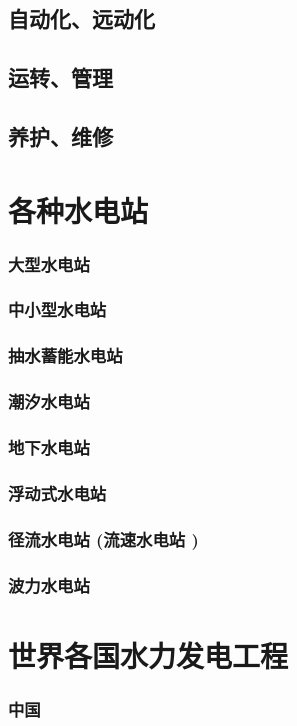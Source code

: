 \documentclass[UTF8]{../../ApplicationUniverse}
\begin{document}
    \subsection{自动化、远动化}
    \subsection{运转、管理}
    \subsection{养护、维修}
\section{各种水电站}
    \subsubsection{大型水电站}
    \subsubsection{中小型水电站}
    \subsubsection{抽水蓄能水电站}
    \subsubsection{潮汐水电站}
    \subsubsection{地下水电站}
    \subsubsection{浮动式水电站}
    \subsubsection{径流水电站 (流速水电站 )}
    \subsubsection{波力水电站}
\section{世界各国水力发电工程}
    \subsubsection{中国}
\end{document}
